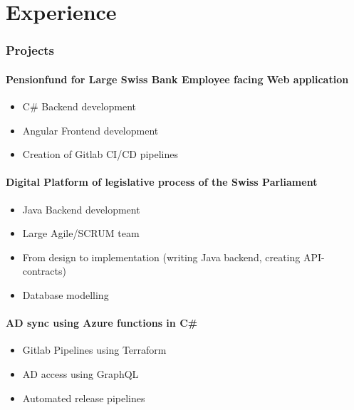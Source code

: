 \section{Experience}
\vspace{-1em}
\subsubsection*{Projects}
\paragraph{Pensionfund for Large Swiss Bank Employee facing Web application}
\begin{itemize}
    \item C\# Backend development
    \item Angular Frontend development
    \item Creation of Gitlab CI/CD pipelines
\end{itemize}

\paragraph{Digital Platform of legislative process of the Swiss Parliament}
\begin{itemize}
    \item Java Backend development
    \item Large Agile/SCRUM team
    \item From design to implementation (writing Java backend, creating API-contracts)
    \item Database modelling
\end{itemize}

\paragraph{AD sync using Azure functions in C\#}
\begin{itemize}
    \item Gitlab Pipelines using Terraform
    \item AD access using GraphQL
    \item Automated release pipelines
\end{itemize}
